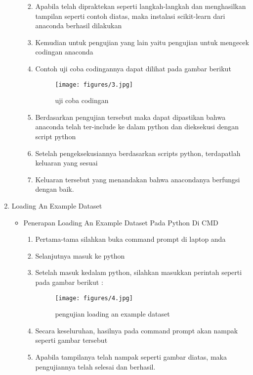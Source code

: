\begin{enumerate}
\begin{itemize}
\begin{enumerate}
\par
\par
\par
\item Apabila telah dipraktekan seperti langkah-langkah dan menghasilkan tampilan seperti contoh diatas, maka instalasi scikit-learn dari anaconda berhasil dilakukan
\par
\item Kemudian untuk pengujian yang lain yaitu pengujian untuk mengecek codingan anaconda
\par
\item Contoh uji coba codingannya dapat dilihat pada gambar berikut
\par
\begin{figure}[ht]
\centering
\texttt{[image: figures/3.jpg]}
\caption{uji coba codingan}
\label{contoh}
\end{figure}
\par
\item Berdasarkan pengujian tersebut maka dapat dipastikan bahwa anaconda telah ter-include ke dalam python dan dieksekusi dengan script python
\item Setelah pengeksekusiannya berdasarkan scripts python, terdapatlah keluaran yang sesuai
\item Keluaran tersebut yang menandakan bahwa anacondanya berfungsi dengan baik.
\end{enumerate}
\end{itemize}


\par
\item Loading An Example Dataset
\begin{itemize}
\item Penerapan Loading An Example Dataset Pada Python Di CMD
\begin{enumerate}
\item Pertama-tama silahkan buka command prompt di laptop anda
\item Selanjutnya masuk ke python
\item Setelah masuk kedalam python, silahkan masukkan perintah seperti pada gambar berikut :

\begin{figure}[ht]
\centering
\texttt{[image: figures/4.jpg]}
\caption{pengujian loading an example dataset}
\label{contoh}
\end{figure}

\par
\item Secara keseluruhan, hasilnya pada command prompt akan nampak seperti gambar tersebut
\item Apabila tampilanya telah nampak seperti gambar diatas, maka pengujiannya telah selesai dan berhasil.
\end{enumerate}


\end{itemize}
\end{enumerate}

